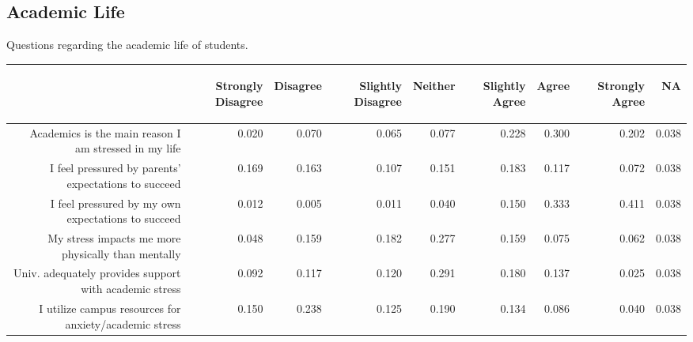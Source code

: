 \documentclass{article}\usepackage[]{graphicx}\usepackage[]{color}
\begin{document}
\subsection{Academic Life}
Questions regarding the academic life of students.
\begin{table}[ht]
\centering
\begin{tabular}{rrrrrrrrr}
  \hline
 & \begin{sideways} Strongly Disagree \end{sideways} & \begin{sideways} Disagree \end{sideways} & \begin{sideways} Slightly Disagree \end{sideways} & \begin{sideways} Neither \end{sideways} & \begin{sideways} Slightly Agree \end{sideways} & \begin{sideways} Agree \end{sideways} & \begin{sideways} Strongly Agree \end{sideways} & \begin{sideways} NA \end{sideways} \\ 
  \hline
Academics is the main reason I am stressed in my life & 0.020 & 0.070 & 0.065 & 0.077 & 0.228 & 0.300 & 0.202 & 0.038 \\ 
  I feel pressured by parents' expectations to succeed & 0.169 & 0.163 & 0.107 & 0.151 & 0.183 & 0.117 & 0.072 & 0.038 \\ 
  I feel pressured by my own expectations to succeed & 0.012 & 0.005 & 0.011 & 0.040 & 0.150 & 0.333 & 0.411 & 0.038 \\ 
  My stress impacts me more physically than mentally & 0.048 & 0.159 & 0.182 & 0.277 & 0.159 & 0.075 & 0.062 & 0.038 \\ 
  Univ. adequately provides support with academic stress & 0.092 & 0.117 & 0.120 & 0.291 & 0.180 & 0.137 & 0.025 & 0.038 \\ 
  I utilize campus resources for anxiety/academic stress & 0.150 & 0.238 & 0.125 & 0.190 & 0.134 & 0.086 & 0.040 & 0.038 \\ 
   \hline
\end{tabular}
\end{table}
\end{document}
